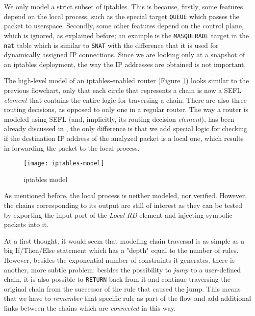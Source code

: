 \documentclass[twoside, 11pt, a4paper]{article}
\begin{document}
We only model a strict subset of iptables. This is because, firstly, some
features depend on the local process, such as the special target \texttt{QUEUE}
which passes the packet to userspace.  Secondly, some other features depend
on the control plane, which is ignored, as explained before; an example is the
\texttt{MASQUERADE} target in the \texttt{nat} table which is similar to
\texttt{SNAT} with the difference that it is used for dynamically assigned IP
connections.  Since we are looking only at a snapshot of an iptables
deployment, the way the IP addresses are obtained is not important.

The high-level model of an iptables-enabled router (Figure
\ref{iptables-model}) looks similar to the previous flowchart, only that each
circle that represents a chain is now a SEFL \emph{element} that contains the
entire logic for traversing a chain.  There are also three routing decisions,
as opposed to only one in a regular router.  The way a router is modeled using
SEFL (and, implicitly, its routing decision \emph{element}), has been already
discussed in \cite{stoenescu2016symnet}, the only difference is that we add
special logic for checking if the destination IP address of the analyzed packet
is a local one, which results in forwarding the packet to the local process.

\begin{figure}[t]
  \centering
  \texttt{[image: iptables-model]}
  \caption{iptables model}
  \label{iptables-model}
\end{figure}

As mentioned before, the local process is neither modeled, nor verified.
However, the chains corresponding to its output are still of interest as they
can be tested by exporting the input port of the \emph{Local RD} element and
injecting symbolic packets into it.

At a first thought, it would seem that modeling chain traversal is as simple as
a big If/Then/Else statement which has a "depth" equal to the number of rules.
However, besides the exponential number of constraints it generates, there
is another, more subtle problem: besides the possibility to \emph{jump} to a
user-defined chain, it is also possible to \texttt{RETURN} back from it and
continue traversing the original chain from the successor of the rule that
caused the jump. This means that we have to \emph{remember} that specific rule
as part of the flow and add additional links between the chains which are
\emph{connected} in this way.
\end{document}
